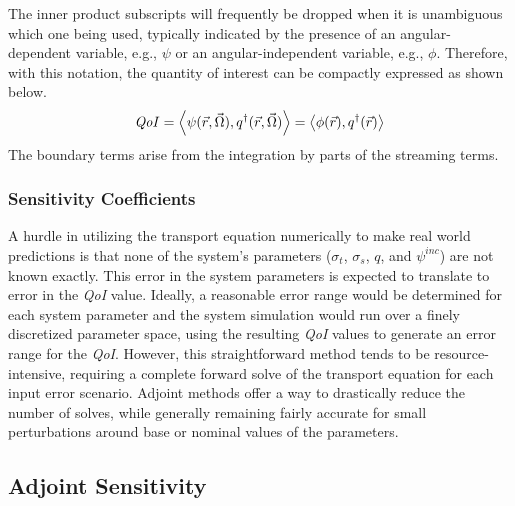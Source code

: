 \documentclass{article}
\newcommand{\vr}{\vec{r}}
\newcommand{\vO}{\vec{\Omega}}
\newcommand{\bra}{\left\langle}
\newcommand{\ket}{\right\rangle}
\newcommand{\sigt}{\sigma_t}
\newcommand{\sigs}{\sigma_s}
\newcommand{\angResp}{q^\dag}
\newcommand{\scalResp}{q^\dag}
\newcommand{\qoi}{{\it QoI}\xspace}
\begin{document}
The inner product subscripts will frequently be dropped when it is unambiguous which one being used, typically indicated by the presence of an angular-dependent variable, e.g., $\psi$ or an angular-independent variable, e.g., $\phi$. Therefore, with this notation, the quantity of interest can be compactly expressed as shown below.
\begin{equation}
\label{QoIDef}
\qoi = \bra \psi(\vr,\vO), \angResp(\vr,\vO) \ket  = \bra \phi(\vr) , \scalResp(\vr) \ket
\end{equation}
The boundary terms arise from the integration by parts of the streaming terms.

\subsubsection{Sensitivity Coefficients}
A hurdle in utilizing the transport equation numerically to make real world predictions is that none of the system's parameters ($\sigt$, $\sigs$, $q$, and $\psi^{inc}$) are not known exactly. This error in the system parameters is expected to translate to error in the \qoi value. Ideally, a reasonable error range would be determined for each system parameter and the system simulation would run over a finely discretized parameter space, using the resulting \qoi values to generate an error range for the \qoi. However, this straightforward method tends to be resource-intensive, requiring a complete forward solve of the transport equation for each input error scenario. Adjoint methods offer a way to drastically reduce the number of solves, while generally remaining fairly accurate for small perturbations around base or nominal values of the parameters.


\subsection{Adjoint Sensitivity}
\end{document}
